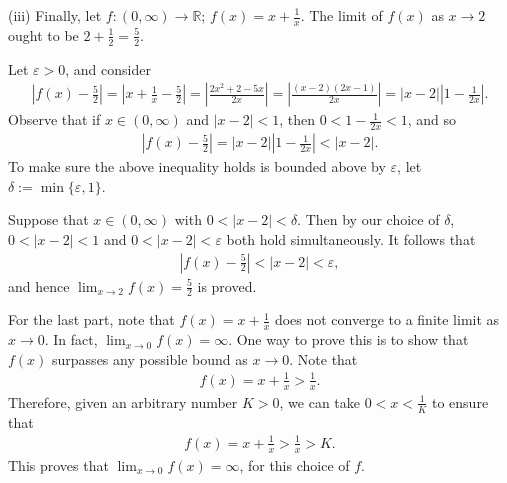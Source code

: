 \documentclass[letterpaper,10pt,english]{jupyterBook}
\begin{document}
\sphinxAtStartPar
(iii) Finally, let \(f:(0,\infty)\to\mathbb{R}\); \(f(x)=x+\frac{1}{x}\). The limit of \(f(x)\) as \(x\rightarrow 2\) ought to be \(2+\frac{1}{2}=\frac{5}{2}\).

\sphinxAtStartPar
Let \(\varepsilon>0\), and consider
\begin{equation*}
\begin{split}
\left|f(x)-\frac{5}{2}\right| = \left|x+\frac{1}{x}-\frac{5}{2}\right| = \left|\frac{2x^2+2-5x}{2x}\right| = \left|\frac{(x-2)(2x-1)}{2x}\right| = |x-2|\left|1-\frac{1}{2x}\right|.
\end{split}
\end{equation*}
\sphinxAtStartPar
Observe that if \(x\in(0,\infty)\) and \(|x-2|<1\), then \(0<1-\frac{1}{2x}<1\), and so
\begin{equation*}
\begin{split}
\left|f(x)-\frac{5}{2}\right| = |x-2|\left|1-\frac{1}{2x}\right| < |x-2|.
\end{split}
\end{equation*}
\sphinxAtStartPar
To make sure the above inequality holds  is bounded above by \(\varepsilon\), let \(\delta:=\min\{\varepsilon,1\}\).

\sphinxAtStartPar
Suppose that \(x\in(0,\infty)\) with \(0<|x-2|<\delta\). Then by our choice of \(\delta\), \(0<|x-2|<1\) and \(0<|x-2|<\varepsilon\) both hold simultaneously. It follows that
\begin{equation*}
\begin{split}
\left|f(x)-\frac{5}{2}\right|<|x-2|<\varepsilon,
\end{split}
\end{equation*}
\sphinxAtStartPar
and hence \(\lim_{x\rightarrow 2}f(x)=\frac{5}{2}\) is proved.

\sphinxAtStartPar
For the last part, note that \(f(x)=x+\frac{1}{x}\) does not converge to a finite limit as \(x\rightarrow 0\). In fact, \(\lim_{x\rightarrow 0}f(x)=\infty\). One way to prove this is to show that \(f(x)\) surpasses any possible bound as \(x\rightarrow 0\). Note that
\begin{equation*}
\begin{split}
f(x) = x+\frac{1}{x} > \frac{1}{x}.
\end{split}
\end{equation*}
\sphinxAtStartPar
Therefore, given an arbitrary number \(K>0\), we can take \(0<x<\frac{1}{K}\) to ensure that
\begin{equation*}
\begin{split}
f(x) = x+\frac{1}{x} > \frac{1}{x} > K.
\end{split}
\end{equation*}
\sphinxAtStartPar
This proves that \(\lim_{x\rightarrow 0} f(x) = \infty\), for this choice of \(f\).
\end{document}
